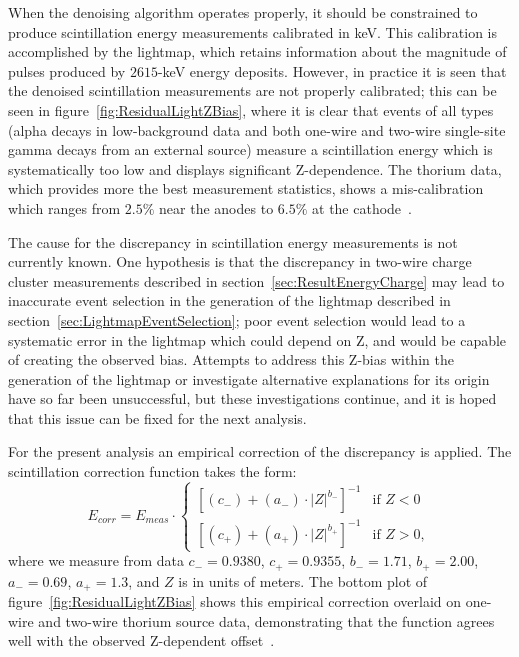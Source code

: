 When the denoising algorithm operates properly, it should be constrained to produce scintillation energy measurements calibrated in keV.  This calibration is accomplished by the lightmap, which retains information about the magnitude of pulses produced by $2615$-keV energy deposits.  However, in practice it is seen that the denoised scintillation measurements are not properly calibrated; this can be seen in figure~\ref{fig:ResidualLightZBias}, where it is clear that events of all types (alpha decays in low-background data and both one-wire and two-wire single-site gamma decays from an external source) measure a scintillation energy which is systematically too low and displays significant Z-dependence.  The thorium data, which provides more the best measurement statistics, shows a mis-calibration which ranges from $2.5\%$ near the anodes to $6.5\%$ at the cathode~\cite{EnergyDocumentRun2ab}.

The cause for the discrepancy in scintillation energy measurements is not currently known.  One hypothesis is that the discrepancy in two-wire charge cluster measurements described in section~\ref{sec:ResultEnergyCharge} may lead to inaccurate event selection in the generation of the lightmap described in section~\ref{sec:LightmapEventSelection}; poor event selection would lead to a systematic error in the lightmap which could depend on Z, and would be capable of creating the observed bias.  Attempts to address this Z-bias within the generation of the lightmap or investigate alternative explanations for its origin have so far been unsuccessful, but these investigations continue, and it is hoped that this issue can be fixed for the next analysis.

For the present analysis an empirical correction of the discrepancy is applied.  The scintillation correction function takes the form:
\begin{equation}
E_{corr} = E_{meas}\cdot \begin{cases}
\left[ (c_{-}) + (a_{-})\cdot |Z|^{b_{-}} \right]^{-1} & \text{if } Z < 0\\
\left[ (c_{+}) + (a_{+})\cdot |Z|^{b_{+}} \right]^{-1} & \text{if } Z > 0,
\end{cases}\end{equation}
where we measure from data $c_{-} = 0.9380$, $c_{+} = 0.9355$, $b_{-} = 1.71$, $b_{+} = 2.00$, $a_{-} = 0.69$, $a_{+} = 1.3$, and $Z$ is in units of meters.  The bottom plot of figure~\ref{fig:ResidualLightZBias} shows this empirical correction overlaid on one-wire and two-wire thorium source data, demonstrating that the function agrees well with the observed Z-dependent offset~\cite{EnergyDocumentRun2ab}.

